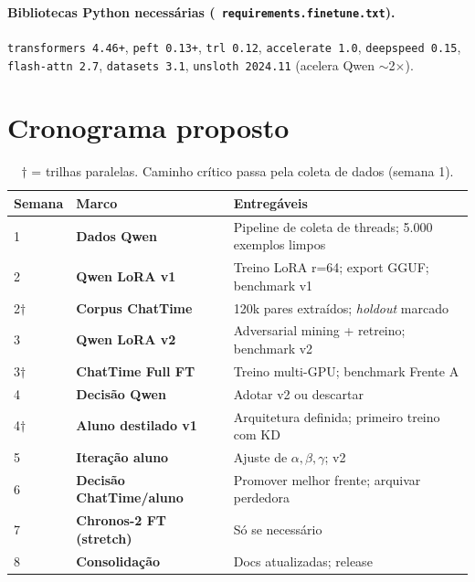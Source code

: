 \documentclass[11pt,a4paper]{article}
\newcommand{\code}[1]{\texttt{\small #1}}
\newcommand{\file}[1]{\texttt{\small\color{black!75} #1}}
\begin{document}
\paragraph{Bibliotecas Python necessárias (\file{requirements.finetune.txt}).}
\code{transformers 4.46+}, \code{peft 0.13+}, \code{trl 0.12},
\code{accelerate 1.0}, \code{deepspeed 0.15}, \code{flash-attn 2.7},
\code{datasets 3.1}, \code{unsloth 2024.11} (acelera Qwen $\sim$2$\times$).

\section{Cronograma proposto}

\begin{table}[h!]
\centering
\small
\renewcommand{\arraystretch}{1.15}
\begin{tabularx}{\textwidth}{@{}l l X@{}}
\toprule
\textbf{Semana} & \textbf{Marco} & \textbf{Entregáveis} \\
\midrule
1  & \textbf{Dados Qwen}      & Pipeline de coleta de threads; 5.000 exemplos limpos \\
2  & \textbf{Qwen LoRA v1}    & Treino LoRA r=64; export GGUF; benchmark v1 \\
2$\dagger$ & \textbf{Corpus ChatTime} & 120k pares extraídos; \emph{holdout} marcado \\
3  & \textbf{Qwen LoRA v2}    & Adversarial mining + retreino; benchmark v2 \\
3$\dagger$ & \textbf{ChatTime Full FT} & Treino multi-GPU; benchmark Frente A \\
4  & \textbf{Decisão Qwen}    & Adotar v2 ou descartar \\
4$\dagger$ & \textbf{Aluno destilado v1} & Arquitetura definida; primeiro treino com KD \\
5  & \textbf{Iteração aluno}  & Ajuste de $\alpha,\beta,\gamma$; v2 \\
6  & \textbf{Decisão ChatTime/aluno} & Promover melhor frente; arquivar perdedora \\
7  & \textbf{Chronos-2 FT (stretch)} & Só se necessário \\
8  & \textbf{Consolidação}    & Docs atualizadas; release \\
\bottomrule
\end{tabularx}
\caption{$\dagger$ = trilhas paralelas. Caminho crítico passa pela
coleta de dados (semana 1).}
\end{table}
\end{document}
